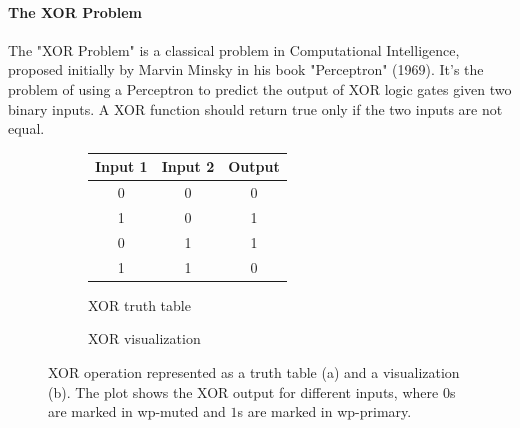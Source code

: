\documentclass{tufte-handout}
\begin{document}
\paragraph{The XOR Problem}

The "XOR Problem" is a classical problem in Computational Intelligence, proposed initially by Marvin Minsky in his book "Perceptron" (1969). It's the problem of using a Perceptron to predict the output of XOR logic gates given two binary inputs. A XOR function should return true only if the two inputs are not equal.

\begin{figure}[h]
    \centering
    \begin{subfigure}{0.45\textwidth}
        \centering
        \begin{tabular}{c|c|c}
            Input 1 & Input 2 & Output \\
            \hline
            0 & 0 & 0 \\
            \hline
            1 & 0 & 1 \\
            \hline
            0 & 1 & 1 \\
            \hline
            1 & 1 & 0 \\
        \end{tabular}
        \caption{XOR truth table}
        \label{tab:xor}
    \end{subfigure}
    \begin{subfigure}{0.45\textwidth}
        \centering
        \caption{XOR visualization}
        \label{fig:xor_plot}
    \end{subfigure}
    \caption{XOR operation represented as a truth table (a) and a visualization (b). The plot shows the XOR output for different inputs, where $0$s are marked in \textcolor{wp-muted}{wp-muted} and $1$s are marked in \textcolor{wp-primary}{wp-primary}.}
    \label{fig:xor_combined}
\end{figure}
\end{document}
